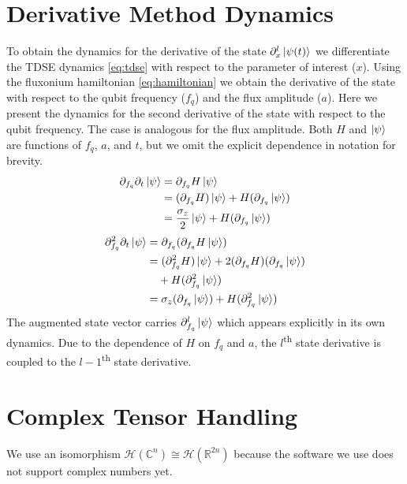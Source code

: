 \documentclass[
  amsfonts,
  amsmath,
  tbtags,
  amssymb,
  aps,
  nobibnotes,
  twocolumn,
  superscriptaddress,
]{revtex4-2}
\begin{document}
\section{Derivative Method Dynamics}
To obtain the dynamics for the derivative of the state $\partial_{x}^{l} \ket{\psi(t)}$
we differentiate the TDSE dynamics \ref{eq:tdse} with respect to the parameter of interest
($x$). Using the fluxonium hamiltonian \ref{eq:hamiltonian} we obtain the derivative of the
state with respect to the qubit frequency ($f_{q}$) and the flux amplitude ($a$).
Here we present the dynamics for the second derivative of the state with respect to the
qubit frequency. The case is analogous for the flux amplitude. Both $H$ and $\ket{\psi}$ are functions
of $f_{q}$, $a$, and $t$, but we omit the explicit dependence in notation for
brevity.
\begin{equation}
  \begin{aligned}
      \partial_{f_{q}} \partial_{t} \ket{\psi} &= \partial_{f_{q}} H \ket{\psi}\\
      &= (\partial_{f_{q}} H) \ket{\psi} + H (\partial_{f_{q}} \ket{\psi})\\
      &= \frac{\sigma_{z}}{2} \ket{\psi} + H (\partial_{f_{q}} \ket{\psi})
  \end{aligned}
\end{equation}
\begin{equation}
  \begin{aligned}
    \partial_{f_{q}}^{2} \partial_{t} \ket{\psi} &= \partial_{f_{q}} (\partial_{f_{q}} H \ket{\psi})\\
    &= (\partial_{f_{q}}^{2} H) \ket{\psi} + 2 (\partial_{f_{q}} H)(\partial_{f_{q}} \ket{\psi})\\
    &\quad + H (\partial_{f_{q}}^{2} \ket{\psi})\\
    &= \sigma_{z} (\partial_{f_{q}} \ket{\psi}) + H (\partial_{f_{q}}^{2} \ket{\psi})
  \end{aligned}
\end{equation}
The augmented state vector carries $\partial_{f_{q}}^{l} \ket{\psi}$
which appears explicitly in its own dynamics. Due to the dependence of $H$ on $f_{q}$ and $a$,
the $l$\textsuperscript{th} state derivative is coupled to the
$l - 1$\textsuperscript{th} state derivative.


\section{Complex Tensor Handling}
We use an isomorphism $\mathcal{H}(\mathbb{C}^{n}) \cong \mathcal{H}(\mathbb{R}^{2n})$
because the software we use does not support complex numbers yet.



\end{document}
